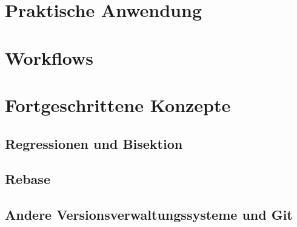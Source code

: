 \section{Praktische Anwendung}
\label{sec:Praxis}
\section{Workflows}
\label{sec:Workflows}
\section{Fortgeschrittene Konzepte}
\label{sec:FortgeschritteneKonzepte}
\subsection{Regressionen und Bisektion}\label{sec:bisec}
\subsection{Rebase}\label{sec:rebase}
\subsection{Andere Versionsverwaltungssysteme und Git}
\label{sec:AndereVersionsverwaltungssystemeundGit}
